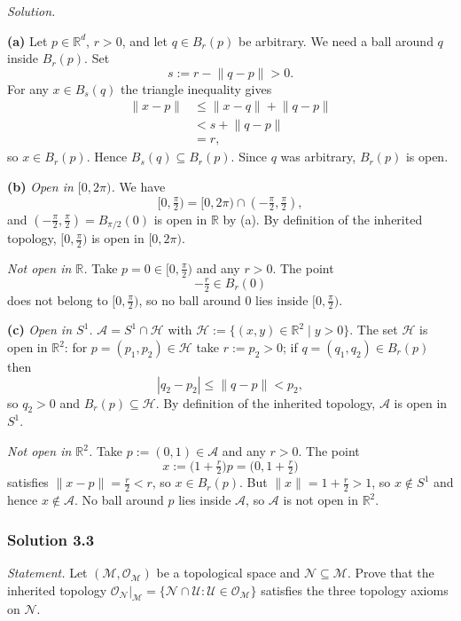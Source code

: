 \documentclass[11pt]{article}
\begin{document}
\medskip
\noindent\textit{Solution.}

\textbf{(a)} Let $p\in\mathbb R^d$, $r>0$, and let $q\in B_r(p)$ be arbitrary. We need a ball around $q$ inside $B_r(p)$. Set
\[
s:=r-\lVert q-p\rVert>0.
\]
For any $x\in B_s(q)$ the triangle inequality gives
\begin{align*}
\lVert x-p\rVert
&\le\lVert x-q\rVert+\lVert q-p\rVert\\
&<s+\lVert q-p\rVert\\
&=r,
\end{align*}
so $x\in B_r(p)$. Hence $B_s(q)\subseteq B_r(p)$. Since $q$ was arbitrary, $B_r(p)$ is open.

\textbf{(b)} \emph{Open in $[0,2\pi)$.} We have
\[
[0,\tfrac\pi2)=[0,2\pi)\cap(-\tfrac\pi2,\tfrac\pi2),
\]
and $(-\tfrac\pi2,\tfrac\pi2)=B_{\pi/2}(0)$ is open in $\mathbb R$ by (a). By definition of the inherited topology, $[0,\tfrac\pi2)$ is open in $[0,2\pi)$.

\emph{Not open in $\mathbb R$.} Take $p=0\in[0,\tfrac\pi2)$ and any $r>0$. The point
\[
-\tfrac r2\in B_r(0)
\]
does not belong to $[0,\tfrac\pi2)$, so no ball around $0$ lies inside $[0,\tfrac\pi2)$.

\textbf{(c)} \emph{Open in $S^1$.} $\mathcal A=S^1\cap\mathcal H$ with $\mathcal H:=\{(x,y)\in\mathbb R^2\mid y>0\}$. The set $\mathcal H$ is open in $\mathbb R^2$: for $p=(p_1,p_2)\in\mathcal H$ take $r:=p_2>0$; if $q=(q_1,q_2)\in B_r(p)$ then
\[
|q_2-p_2|\le\lVert q-p\rVert<p_2,
\]
so $q_2>0$ and $B_r(p)\subseteq\mathcal H$. By definition of the inherited topology, $\mathcal A$ is open in $S^1$.

\emph{Not open in $\mathbb R^2$.} Take $p:=(0,1)\in\mathcal A$ and any $r>0$. The point
\[
x:=\big(1+\tfrac r2\big)p=\big(0,1+\tfrac r2\big)
\]
satisfies $\lVert x-p\rVert=\tfrac r2<r$, so $x\in B_r(p)$. But $\lVert x\rVert=1+\tfrac r2>1$, so $x\notin S^1$ and hence $x\notin\mathcal A$. No ball around $p$ lies inside $\mathcal A$, so $\mathcal A$ is not open in $\mathbb R^2$.

\subsubsection*{Solution 3.3}

\noindent\textit{Statement.} Let $(\mathcal M,\mathcal O_{\mathcal M})$ be a topological space and $\mathcal N\subseteq\mathcal M$. Prove that the inherited topology $\mathcal O_{\mathcal N}|_{\mathcal M}=\{\mathcal N\cap\mathcal U:\mathcal U\in\mathcal O_{\mathcal M}\}$ satisfies the three topology axioms on $\mathcal N$.
\end{document}

